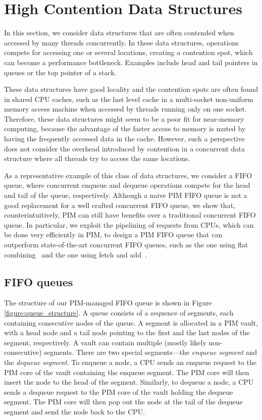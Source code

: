 
\section{High Contention Data Structures}
\label{section:contended}
In this section, we consider data structures that are often contended when accessed 
by many threads concurrently. In these data structures, operations compete for accessing one or several 
locations, creating a contention spot, which can become a performance bottleneck.
Examples include head and tail pointers in queues or the top pointer of a stack.

These data structures have good locality and the contention spots are often found 
in shared CPU caches, such as the last level cache in a multi-socket non-uniform memory access machine 
when accessed by threads running only on one socket. Therefore, these data structures might 
seem to be a poor fit for near-memory computing, because the advantage of the faster access to memory is 
muted by having the frequently accessed data in the cache. 
However, such a perspective does not 
consider the overhead introduced by contention in a concurrent data structure where all threads 
try to access the same locations. 

As a representative example of this class of data structures, we consider a FIFO queue, 
where concurrent enqueue
and dequeue operations compete for the head and tail of the queue, respectively. 
Although a naive PIM FIFO queue is not a good replacement for a well crafted concurrent FIFO queue, 
we show that, counterintuitively, PIM can still have benefits over a traditional concurrent FIFO 
queue. In particular, we exploit the pipelining of requests from CPUs, which can be done very efficiently in PIM, to 
design a PIM FIFO queue that can outperform state-of-the-art concurrent FIFO queues, such as the one using flat combining~\cite{Hendler10} 
and the one using fetch and add~\cite{Morrison13}.

\subsection{FIFO queues}
The structure of our PIM-managed FIFO queue is shown in Figure \ref{figure:queue_structure}.
A queue consists of a sequence of segments, each containing consecutive nodes of the queue.
A segment is allocated in a PIM vault, with a head node and a tail node pointing to the first 
and the last nodes of the segment, respectively.
A vault can contain multiple (mostly likely non-consecutive) segments. 
There are two special segments---the \textit{enqueue segment} and the \textit{dequeue segment}.
To enqueue a node, a CPU sends an enqueue request to the PIM core of the vault 
containing the enqueue segment.
The PIM core will then insert the node to the head of the segment.
Similarly, to dequeue a node, a CPU sends a dequeue request to the PIM core of the vault
holding the dequeue segment. 
The PIM core will then pop out the node at the tail of the dequeue segment and 
send the node back to the CPU.

